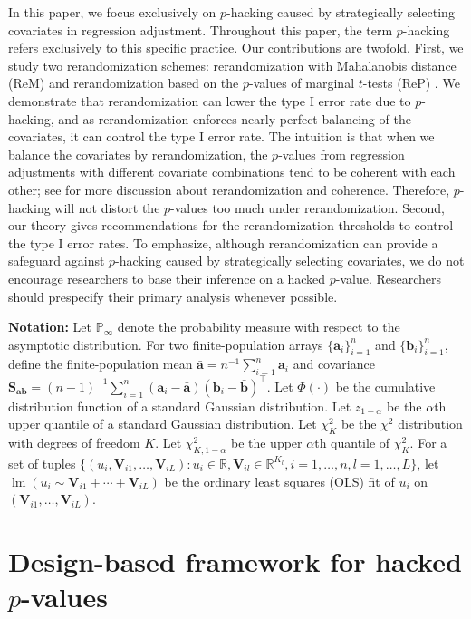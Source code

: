 \documentclass[12pt]{article}
\newcommand{\Prob}{\mathbb{P}}
\newcommand{\bs}{\boldsymbol}
\newcommand{\sumi}{\sum_{i=1}^n}
\newcommand{\lx}[1]{#1}
\begin{document}
 \lx{In this paper, we focus exclusively on $p$-hacking caused by
strategically selecting covariates in regression adjustment. Throughout this
paper, the term $p$-hacking refers exclusively to this specific practice.}
 Our contributions are twofold. First,  we study two rerandomization schemes: rerandomization with Mahalanobis distance (ReM) \citep{cox1982randomization,morgan2012rerandomization} and rerandomization based on the $p$-values of marginal $t$-tests (ReP) \citep{gerber2012field,zdrep}. We demonstrate that rerandomization can lower the type I error rate due to $p$-hacking, and as rerandomization enforces nearly perfect balancing of the covariates, it can control the type I error rate. The intuition is that when we balance the covariates by rerandomization, the $p$-values from regression adjustments with different covariate combinations tend to be coherent with each other; see \citet{zdrep} for more discussion about rerandomization and coherence. Therefore, $p$-hacking will not distort the $p$-values too much under rerandomization. Second, our theory gives recommendations for the rerandomization thresholds to control the type I error rates.
\lx{To emphasize, although rerandomization can provide a safeguard against
$p$-hacking caused by strategically selecting covariates, we do not
encourage researchers to base their inference on a hacked $p$-value.
Researchers should prespecify their primary analysis whenever possible. }

\textbf{Notation:}  Let $\Prob_{\infty}$ denote the probability measure with respect to the asymptotic distribution. 
For two finite-population arrays $\{\bs{a}_i\}_{i=1}^n$ and $\{\bs{b}_i\}_{i=1}^n$, define the finite-population mean $\bar{\bs{a}} = n^{-1}\sumi \bs{a}_i$ and  covariance $    \bs{S}_{\bs{a}\bs{b}} = (n-1)^{-1}\sum_{i=1}^n (\bs{a}_i-\bar{\bs{a}})(\bs{b}_i-\bar{\bs{b}})^\top.$
Let $\Phi(\cdot)$ be the cumulative distribution function of a standard Gaussian distribution. Let $z_{1-\alpha}$ be the  $\alpha$th upper quantile of a standard Gaussian distribution. Let $\chi^2_{K}$ be the $\chi^2$ distribution with degrees of freedom $K$. Let $\chi_{K,1-\alpha}^2$ be the upper $\alpha$th quantile of $\chi^2_{K}$. For a set of tuples $\{(u_i,\bs{V}_{i1},\ldots,\bs{V}_{iL}):u_i\in\mathbb{R},\bs{V}_{il}\in\mathbb{R}^{K_l},i=1,\ldots,n,l=1,\ldots,L\}$, let $\operatorname{lm}(u_i\sim \bs{V}_{i1}+\cdots+\bs{V}_{iL})$ be the ordinary least squares (OLS) fit of $u_i$ on  $(\bs{V}_{i1},\ldots,\bs{V}_{iL})$. 

\section{Design-based framework for hacked $p$-values}
\end{document}
